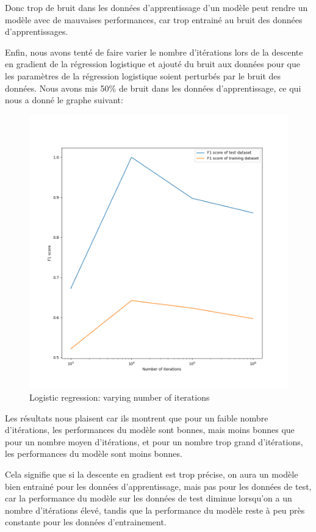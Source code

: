 \documentclass[
]{article}
\begin{document}
Donc trop de bruit dans les données d'apprentissage d'un modèle peut
rendre un modèle avec de mauvaises performances, car trop entrainé au
bruit des données d'apprentissages.

Enfin, nous avons tenté de faire varier le nombre d'itérations lors de
la descente en gradient de la régression logistique et ajouté du bruit
aux données pour que les paramètres de la régression logistique soient
perturbés par le bruit des données. Nous avons mis 50\% de bruit dans
les données d'apprentissage, ce qui nous a donné le graphe suivant:

\begin{figure}
\centering
\includegraphics{../res/overfitting_test.png}
\caption{Logistic regression: varying number of iterations}
\end{figure}

Les résultats nous plaisent car ils montrent que pour un faible nombre
d'itérations, les performances du modèle sont bonnes, mais moins bonnes
que pour un nombre moyen d'itérations, et pour un nombre trop grand
d'itérations, les performances du modèle sont moins bonnes.

Cela signifie que si la descente en gradient est trop précise, on aura
un modèle bien entrainé pour les données d'apprentissage, mais pas pour
les données de test, car la performance du modèle sur les données de
test diminue lorsqu'on a un nombre d'itérations élevé, tandis que la
performance du modèle reste à peu près constante pour les données
d'entrainement.
\end{document}

